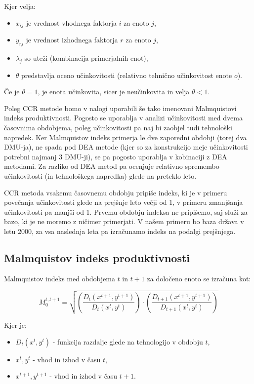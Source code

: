 \documentclass[12pt,a4paper]{article}
\theoremstyle{definition}
\begin{document}
Kjer velja:
\begin{itemize}
    \item \( x_{ij} \) je vrednost vhodnega faktorja \( i \) za enoto \( j \),
    \item \( y_{rj} \) je vrednost izhodnega faktorja \( r \) za enoto \( j \),
    \item \( \lambda_j \) so uteži (kombinacija primerjalnih enot),
    \item \( \theta \) predstavlja oceno učinkovitosti (relativno tehnično učinkovitost enote \( o \)).
\end{itemize}

Če je \( \theta = 1 \), je enota učinkovita, sicer je neučinkovita in velja \( \theta < 1 \).

Poleg CCR metode bomo v nalogi uporabili še tako imenovani Malmquistovi indeks produktivnosti.
Pogosto se uporablja v analizi učinkovitosti med dvema časovnima obdobjema, poleg učinkovitosti
pa naj bi zaobjel tudi tehnološki napredek. Ker Malmquistov indeks
primerja le dve zaporedni obdobji (torej dva DMU-ja), ne spada pod DEA metode
(kjer so za konstrukcijo meje učinkovitosti potrebni najmanj 3 DMU-ji), se pa pogosto uporablja
v kobinaciji z DEA metodami. Za razliko od DEA metod pa ocenjuje relativno spremembo učinkovitosti 
(in tehnološkega napredka) glede na preteklo leto. 

CCR metoda vsakemu časovnemu obdobju pripiše indeks, ki je v primeru povečanja učinkovitosti glede
na prejšnje leto večji od 1, v primeru zmanjšanja učinkovitosti pa manjši od 1. Prvemu obdobju
indeksa ne pripišemo, saj služi za bazo, ki je ne moremo z ničimer primerjati. V našem primeru bo baza 
država v letu 2000, za vsa naslednja leta pa izračunamo indeks na podalgi prejšnjega.

\subsection{Malmquistov indeks produktivnosti}

Malmquistov indeks med obdobjema \( t \) in \( t+1 \) za določeno enoto se izračuna kot:

\begin{equation*}
M_0^{t,t+1} = \sqrt{
\left( \frac{D_t(x^{t+1}, y^{t+1})}{D_t(x^t, y^t)} \right)
\cdot
\left( \frac{D_{t+1}(x^{t+1}, y^{t+1})}{D_{t+1}(x^t, y^t)} \right)
}
\end{equation*}

Kjer je:
\begin{itemize}
    \item \( D_t(x^t, y^t) \) - funkcija razdalje glede na tehnologijo v obdobju \( t \),
    \item \( x^t, y^t \) - vhod in izhod v času \( t \),
    \item \( x^{t+1}, y^{t+1} \) - vhod in izhod v času \( t+1 \).
\end{itemize}
\end{document}
